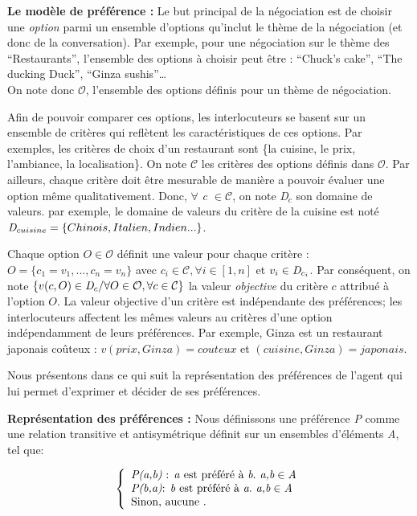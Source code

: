 \documentclass [french]{sig-alternate-05-2015}
\begin{document}
\par \textbf{Le modèle de préférence :}
Le but principal de la négociation est de choisir une \emph{option} parmi un ensemble d'options qu'inclut le thème de la négociation (et donc de la conversation). Par exemple, pour une négociation sur le thème des ``Restaurants'', l'ensemble des options à choisir peut être : ``Chuck's cake'', ``The ducking Duck'', ``Ginza sushis''\ldots \\ On note donc $\mathcal{O}$, l'ensemble des options définis pour un thème de négociation. \par Afin de pouvoir  comparer ces options, les interlocuteurs se basent sur un ensemble de critères qui reflètent les caractéristiques de ces options. Par exemples, les critères de choix d'un restaurant sont \{la cuisine, le prix, l'ambiance, la localisation\}.  On note $\mathcal{C}$ les critères des options définis dans $\mathcal{O}$. Par ailleurs, chaque critère doit être mesurable de manière a pouvoir évaluer une option même qualitativement. Donc, $\forall$ \emph{c $\in\mathcal{ C}$},  on note \emph{D$_c$} son domaine de valeurs. par exemple, le domaine de valeurs du critère de la cuisine est noté $\emph{D}_{cuisine} = \{Chinois, Italien, Indien...\}$.

\par Chaque option $O\in \mathcal{O}$ définit une valeur pour chaque critère : 
$O = \{c_1=v_1,..., c_n=v_n\}$ avec $c_i \in \mathcal{C}, \forall i \in [1,n]$ et $v_i\in \emph{D}_{c_i}$. 
Par conséquent, on note $\{v(c,O) \in \emph{D}_{c} / \forall O \in \mathcal{O}, \forall c \in \mathcal{C}\}$ la valeur \emph{objective} du critère $c$ attribué à l'option $O$. La valeur objective d'un critère est indépendante des préférences; les interlocuteurs affectent les mêmes valeurs au critères d'une option indépendamment de leurs préférences. 
Par exemple, Ginza est un restaurant japonais coûteux : $v(prix, Ginza) = couteux $ et $(cuisine, Ginza) = japonais$. 

\par Nous présentons dans ce qui suit la représentation des préférences de l'agent qui lui permet d'exprimer et décider de ses préférences.
\\ \par \textbf{Représentation des préférences :}
Nous définissons une préférence \emph{P} comme une relation transitive et antisymétrique  définit sur un ensembles d'éléments \emph{A}, tel que:

\[ \left \{
\begin{array}{l}
\emph{P(a,b)} $ : \emph{a}  est préféré à $\emph{b}. \emph{ a,b} \in \emph{A}\\
\emph{P(b,a)} $:  \emph{b} est préféré à  $\emph{a}. \emph{ a,b} \in \emph{A}\\
$Sinon, aucune . $\\
\end{array}
\right .\]
\end{document}

